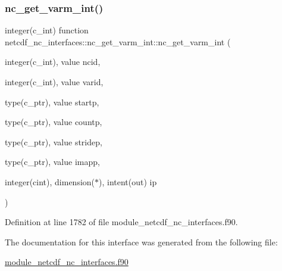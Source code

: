 \subsubsection{\texorpdfstring{nc\+\_\+get\+\_\+varm\+\_\+int()}{nc\_get\_varm\_int()}}
{\footnotesize\ttfamily integer(c\+\_\+int) function netcdf\+\_\+nc\+\_\+interfaces\+::nc\+\_\+get\+\_\+varm\+\_\+int\+::nc\+\_\+get\+\_\+varm\+\_\+int (\begin{DoxyParamCaption}\item[{integer(c\+\_\+int), value}]{ncid,  }\item[{integer(c\+\_\+int), value}]{varid,  }\item[{type(c\+\_\+ptr), value}]{startp,  }\item[{type(c\+\_\+ptr), value}]{countp,  }\item[{type(c\+\_\+ptr), value}]{stridep,  }\item[{type(c\+\_\+ptr), value}]{imapp,  }\item[{integer(cint), dimension($\ast$), intent(out)}]{ip }\end{DoxyParamCaption})}



Definition at line 1782 of file module\+\_\+netcdf\+\_\+nc\+\_\+interfaces.\+f90.



The documentation for this interface was generated from the following file\+:\begin{DoxyCompactItemize}
\item 
\hyperlink{module__netcdf__nc__interfaces_8f90}{module\+\_\+netcdf\+\_\+nc\+\_\+interfaces.\+f90}\end{DoxyCompactItemize}

